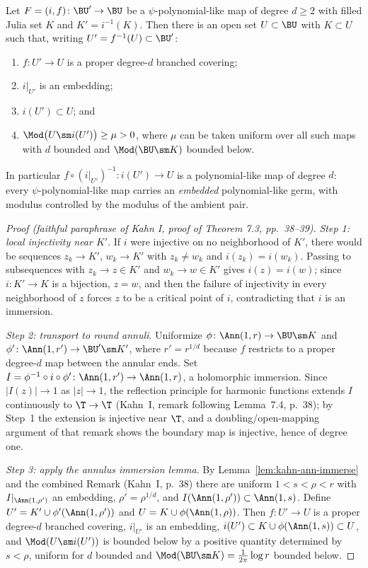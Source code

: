 \begin{theorem}\label{thm:kahn-psql-restriction}
Let \(F=(i,f)\colon\BU'\to\BU\) be a \(\psi\)-polynomial-like map of
degree \(d\ge2\) with filled Julia set \(K\) and \(K'=i^{-1}(K)\).
Then there is an open set \(U\subset\BU\) with \(K\subset U\) such
that, writing \(U'=f^{-1}(U)\subset\BU'\):
\begin{enumerate}
\item \(f\colon U'\to U\) is a proper degree-\(d\) branched covering;
\item \(i|_{U'}\) is an embedding;
\item \(i(U')\subset U\); and
\item \(\Mod\bigl(U\sm i(U')\bigr)\ge\mu>0\), where \(\mu\) can be
taken uniform over all such maps with \(d\) bounded and
\(\Mod(\BU\sm K)\) bounded below.
\end{enumerate}
In particular \(f\circ(i|_{U'})^{-1}\colon i(U')\to U\) is a
polynomial-like map of degree \(d\): every \(\psi\)-polynomial-like map
carries an \emph{embedded} polynomial-like germ, with modulus
controlled by the modulus of the ambient pair.
\end{theorem}

\begin{proof}[Proof (faithful paraphrase of Kahn I, proof of Theorem 7.3, pp.~38--39)]
\emph{Step 1: local injectivity near \(K'\)}.  If \(i\)
were injective on no neighborhood of \(K'\), there would be sequences
\(z_k\to K'\), \(w_k\to K'\) with \(z_k\ne w_k\) and
\(i(z_k)=i(w_k)\).  Passing to subsequences with \(z_k\to z\in K'\)
and \(w_k\to w\in K'\) gives \(i(z)=i(w)\); since
\(i\colon K'\to K\) is a bijection, \(z=w\), and then the failure of
injectivity in every neighborhood of \(z\) forces \(z\) to be a
critical point of \(i\), contradicting that \(i\) is an immersion.

\emph{Step 2: transport to round annuli}.  Uniformize
\(\phi\colon\Ann(1,r)\to\BU\sm K\) and
\(\phi'\colon\Ann(1,r')\to\BU'\sm K'\), where \(r'=r^{1/d}\) because
\(f\) restricts to a proper degree-\(d\) map between the annular ends.
Set \(I=\phi^{-1}\circ i\circ\phi'\colon\Ann(1,r')\to\Ann(1,r)\), a
holomorphic immersion.  Since \(|I(z)|\to1\) as \(|z|\to1\), the
reflection principle for harmonic functions extends \(I\)
continuously to \(\T\to\T\) (Kahn~I, remark following Lemma~7.4, p.~38); by Step~1 the
extension is injective near \(\T\), and a doubling/open-mapping
argument of that remark shows the boundary map is injective, hence of
degree one.

\emph{Step 3: apply the annulus immersion lemma}.  By
Lemma~\ref{lem:kahn-ann-immerse} and the combined Remark
(Kahn~I, p.~38) there are uniform \(1<s<\rho<r\) with
\(I|_{\Ann(1,\rho')}\) an embedding, \(\rho'=\rho^{1/d}\), and
\(I(\Ann(1,\rho'))\subset\Ann(1,s)\).  Define
\(U'=K'\cup\phi'(\Ann(1,\rho'))\) and
\(U=K\cup\phi(\Ann(1,\rho))\).  Then \(f\colon U'\to U\) is a proper
degree-\(d\) branched covering, \(i|_{U'}\) is an embedding,
\(i(U')\subset K\cup\phi(\Ann(1,s))\subset U\), and
\(\Mod(U\sm i(U'))\) is bounded below by a positive quantity
determined by \(s<\rho\), uniform for \(d\) bounded and
\(\Mod(\BU\sm K)=\tfrac{1}{2\pi}\log r\) bounded below.
\end{proof}